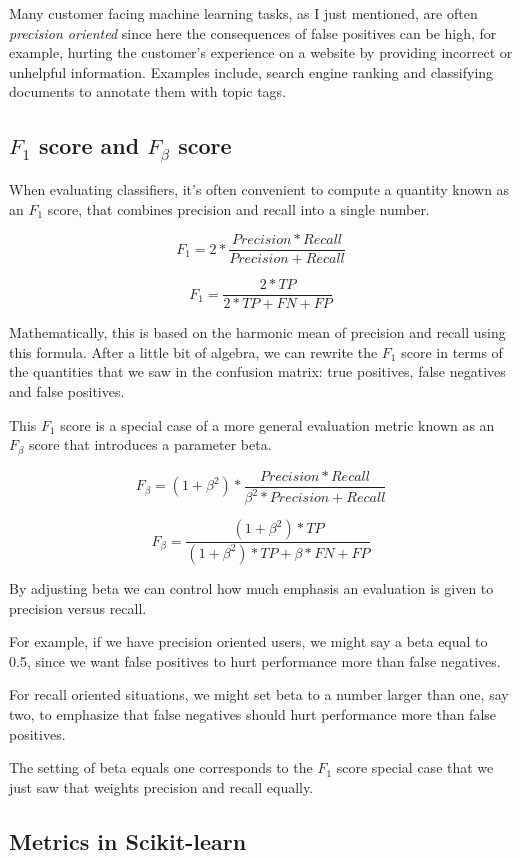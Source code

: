 \begin{multicols}{2}
Many customer facing machine learning tasks, as I just mentioned, are often \emph{precision oriented} since here the consequences of false positives can be high, for example, hurting the customer's experience on a website by providing incorrect or unhelpful information. Examples include, search engine ranking and classifying documents to annotate them with topic tags. 

\subsection*{$F_1$ score and $F_\beta$ score}

When evaluating classifiers, it's often convenient to compute a quantity known as an $F_1$ score, that combines precision and recall into a single number. 

$$F_1 = 2 * \frac{Precision * Recall}{Precision + Recall}$$

$$F_1 = \frac{2*TP}{2*TP+FN+FP}$$

Mathematically, this is based on the harmonic mean of precision and recall using this formula. After a little bit of algebra, we can rewrite the $F_1$ score in terms of the quantities that we saw in the confusion matrix: true positives, false negatives and false positives. 

This $F_1$ score is a special case of a more general evaluation metric known as an $F_\beta$ score that introduces a parameter beta. 

$$F_\beta = (1+\beta^2) * \frac{Precision * Recall}{\beta^2*Precision + Recall}$$

$$F_\beta = \frac{(1+\beta^2)*TP}{(1+\beta^2)*TP+\beta * FN + FP}$$

By adjusting beta we can control how much emphasis an evaluation is given to precision versus recall. 

For example, if we have precision oriented users, we might say a beta equal to 0.5, since we want false positives to hurt performance more than false negatives. 

For recall oriented situations, we might set beta to a number larger than one, say two, to emphasize that false negatives should hurt performance more than false positives. 

The setting of beta equals one corresponds to the $F_1$ score special case that we just saw that weights precision and recall equally. 


\subsection{Metrics in Scikit-learn}


\end{multicols}
